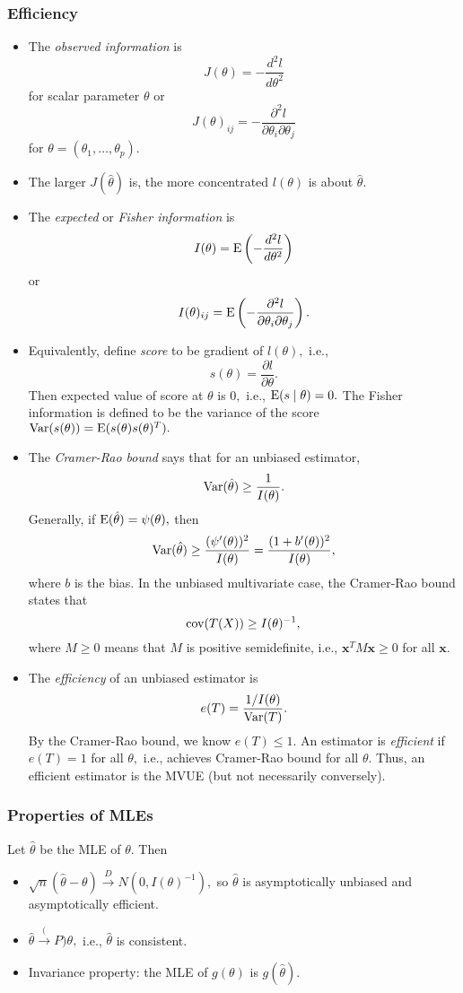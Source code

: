 \documentclass[../ds]{subfiles}
\begin{document}
\subsubsection{Efficiency}
\begin{itemize}
	\item The \textit{observed information} is \[ J(\theta) = -\frac{d^2l}{d \theta^2} \] for scalar parameter $\theta$ or 
	\[ J(\theta)_{ij} = -\frac{\partial^2l}{\partial \theta_i \partial \theta_j} \] for $\theta = (\theta_1, \ldots, \theta_p).$
	\item The larger $J(\hat{\theta})$ is, the more concentrated $l(\theta)$ is about $\hat{\theta}.$
	\item The \textit{expected} or \textit{Fisher information} is \[ I(\theta) = \operatorname{E}\left(-\frac{d^2l}{d \theta^2}\right) \] or
	\[ I(\theta)_{ij} = \operatorname{E}\left(-\frac{\partial^2l}{\partial \theta_i \partial \theta_j}\right). \]
	\item Equivalently, define \textit{score} to be gradient of $l(\theta),$ i.e., \[ s(\theta) = \frac{\partial l}{\partial \theta}. \]
	Then expected value of score at $\theta$ is $0,$ i.e., $\operatorname{E}(s \mid \theta) = 0.$ The Fisher information is defined to be the variance of the score $\operatorname{Var}(s(\theta)) = \operatorname{E}(s(\theta)s(\theta)^T).$
	\item The \textit{Cramer-Rao bound} says that for an unbiased estimator, \[ \operatorname{Var}(\hat{\theta}) \geq \frac{1}{I(\theta)}. \]
	Generally, if $\operatorname{E}(\hat{\theta}) = \psi(\theta),$ then 
	\[ \operatorname{Var}(\hat{\theta}) \geq \frac{(\psi'(\theta))^2}{I(\theta)} = \frac{(1+b'(\theta))^2}{I(\theta)}, \] where $b$ is the bias. In the unbiased multivariate case, the Cramer-Rao bound states that 
	\[ \operatorname{cov}(T(X)) \geq I(\theta)^{-1}, \]
	where $M \geq 0$ means that $M$ is positive semidefinite, i.e., $\mathbf{x}^TM\mathbf{x} \geq 0$ for all $\mathbf{x}.$

	\item The \textit{efficiency} of an unbiased estimator is 
	\[ e(T) = \frac{1/I(\theta)}{\operatorname{Var}(T)}. \] By the Cramer-Rao bound, we know $e(T) \leq 1.$
	An estimator is \textit{efficient} if $e(T) = 1$ for all $\theta,$ i.e., achieves Cramer-Rao bound for all $\theta.$ Thus, an efficient estimator is the MVUE (but not necessarily conversely).
\end{itemize}

\subsubsection{Properties of MLEs}
Let $\hat{\theta}$ be the MLE of $\theta.$ Then
\begin{itemize}
	\item $\sqrt{n}(\hat\theta - \theta) \xrightarrow{D} N(0, I(\theta)^{-1}),$ so $\hat\theta$ is asymptotically unbiased and asymptotically efficient.
	\item $\hat\theta \xrightarrow(P) \theta,$ i.e., $\hat\theta$ is consistent.
	\item Invariance property: the MLE of $g(\theta)$ is $g(\hat\theta).$
\end{itemize}
\end{document}
